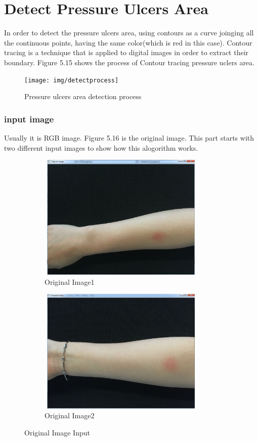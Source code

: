 \section{Detect Pressure Ulcers Area}
In order to detect the pressure ulcers area, using contours as a curve joinging all the continuous points, having the same color(which is red in this case). Contour tracing is a technique that is applied to digital images in order to extract their boundary. Figure 5.15 shows the process of Contour tracing pressure uclers area. 
\begin{figure}[!htb]
	\centering
	\texttt{[image: img/detectprocess]}
	\caption{Pressure ulcers area detection process}
\end{figure}

\newpage
\subsubsection{input image}
Usually it is RGB image. Figure 5.16 is the original image. This part starts with two different input images to show how this alogorithm works.
 \begin{figure}[!htb]
\centering
\begin{subfigure}{.5\textwidth}
  \centering
  \includegraphics[width=8cm,height=6cm]{img/detectoringinal}
  \caption{Original Image1}
  \label{fig:sub1}
\end{subfigure}%
\begin{subfigure}{.5\textwidth}
  \centering
  \includegraphics[width=8cm,height=6cm]{img/detectoringinal2}
  \caption{Original Image2}
  \label{fig:sub2}
\end{subfigure}
\caption{Original Image Input}
\label{fig:test}
\end{figure}


